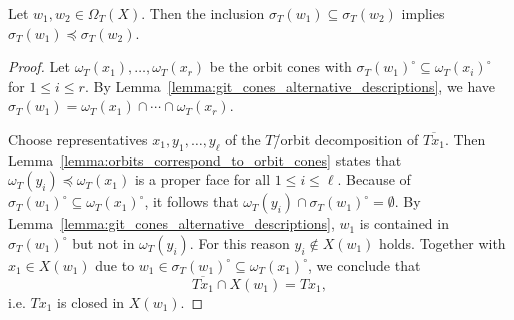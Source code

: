 \begin{lemma}
	\label{lemma:git_cone_subsets_of_git_cones_are_faces}
	Let $w_1,w_2\in\Omega_T(X)$. Then the inclusion $\sigma_T(w_1) \subseteq \sigma_T(w_2)$ implies $\sigma_T(w_1) \preceq \sigma_T(w_2)$.
\end{lemma}
\begin{proof}
	 Let $\omega_T(x_1),\dots,\omega_T(x_r)$ be the orbit cones with $\sigma_T(w_1)^\circ \subseteq \omega_T(x_i)^\circ$ for $1\leq i \leq r$. By Lemma~\ref{lemma:git_cones_alternative_descriptions}, we have $\sigma_T(w_1) = \omega_T(x_1) \cap \cdots \cap \omega_T(x_r)$.
	 
	 Choose representatives $x_1,y_1,\dots,y_\ell$ of the $T$\=/orbit decomposition of $\overline{Tx_1}$.
	 Then Lemma~\ref{lemma:orbits_correspond_to_orbit_cones} states that $\omega_T(y_i) \preceq \omega_T(x_1)$ is a proper face for all $1\leq i \leq \ell$. Because of $\sigma_T(w_1)^\circ \subseteq \omega_T(x_1)^\circ$, it follows that $\omega_T(y_i) \cap \sigma_T(w_1)^\circ = \emptyset$. By Lemma~\ref{lemma:git_cones_alternative_descriptions}, $w_1$ is contained in $\sigma_T(w_1)^\circ$ but not in $\omega_T(y_i)$. For this reason $y_i\notin X(w_1)$ holds. Together with $x_1\in X(w_1)$ due to $w_1\in \sigma_T(w_1)^\circ \subseteq \omega_T(x_1)^\circ$, we conclude that
	 \begin{equation}
		 \label{equa:orbit_closed_in_Xw1}
		 \overline{Tx_1} \cap X(w_1) = Tx_1,
	 \end{equation}
	 i.e. $Tx_1$ is closed in $X(w_1)$.
	 

\end{proof}

